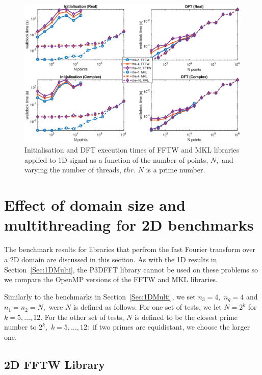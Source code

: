 \documentclass[a4paper]{article}
\begin{document}
\begin{figure}[htb]
    \centering
    \includegraphics[width=\linewidth]{../results/fftw_mkl_prime_1d_thr.eps}
  \caption{Initialisation and DFT execution times of FFTW and MKL libraries applied to 1D signal as a function of the
    number of points, $N,$ and varying the number of threads, $thr.$ $N$ is a prime number.}
  \label{1DFFTWMKLPrime}
\end{figure}


\section{Effect of domain size and multithreading for 2D benchmarks}\label{Sec:2DMulti}
The benchmark results for libraries that perfrom the fast Fourier
transform over a 2D domain are discussed in this section. As with the
1D results in Section~\ref{Sec:1DMulti}, the P3DFFT library cannot be
used on these problems so we compare the OpenMP versions of the FFTW
and MKL libraries.

Similarly to the benchmarks in Section~\ref{Sec:1DMulti}, we set
$n_3=4,$ $n_q=4$ and $n_1=n_2=N,$ were $N$ is defined as follows.  For one
set of tests, we let $N=2^k$ for $k=5,\ldots,12.$ For the other set of
tests, $N$ is defined to be the closest prime number to $2^k,$
$k=5,\ldots,12:$ if two primes are equidistant, we choose the larger
one.

\subsection{2D FFTW Library}\label{Sec:2DFFTW}
\end{document}
